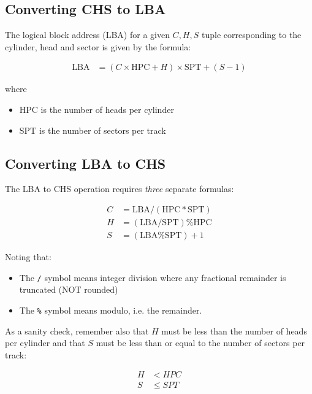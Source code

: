\documentclass[slides]{pgnotes}
\begin{document}
\subsection{Converting CHS to LBA}
\label{sec:converting-chs-to-lba}

The logical block address (LBA) for a given $C, H, S$ tuple corresponding to the cylinder, head and sector is given by the formula:

\begin{align}
  \mbox{LBA} & = ( C \times \mbox{HPC} + H ) \times \mbox{SPT} + ( S - 1 ) \label{eq:chs-to-lba}
\end{align}

where

\begin{itemize}
\item
  HPC is the number of heads per cylinder
\item
  SPT is the number of sectors per track
\end{itemize}

\subsection{Converting LBA to CHS}\label{converting-lba-to-chs}

The LBA to CHS operation requires \textit{three} separate formulas:

\begin{align}
  C & = \mbox{LBA} / ( \mbox{HPC} * \mbox{SPT} ) \label{eq:lba-to-c} \\
  H & = ( \mbox{LBA} / \mbox{SPT} ) \% \mbox{HPC}  \label{eq:lba-to-h} \\
  S & = ( \mbox{LBA} \% \mbox{SPT} ) + 1 \label{eq:lba-to-s}
\end{align}

Noting that:

\begin{itemize}
\item
  The \texttt{/} symbol means integer division where any fractional
  remainder is truncated (NOT rounded)
\item
  The \texttt{\%} symbol means modulo, i.e. the remainder.
\end{itemize}

As a sanity check, remember also that $H$ must be less than the number of
heads per cylinder and that $S$ must be less than or equal to the number
of sectors per track:

\begin{align}
  H & < HPC \label{eq:h-lt-hpc} \\
  S & \le SPT \label{eq:s-le-spt}
\end{align}
\end{document}
